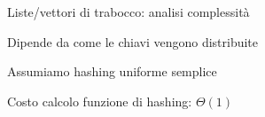 \begin{frame}{Liste/vettori di trabocco: analisi complessità}

\vspace{-9pt}
\BIL
\item Dipende da come le chiavi vengono distribuite
\item Assumiamo hashing uniforme semplice
\item Costo calcolo funzione di hashing: $\Theta(1)$
\EIL

\pause
{}

\end{frame}


